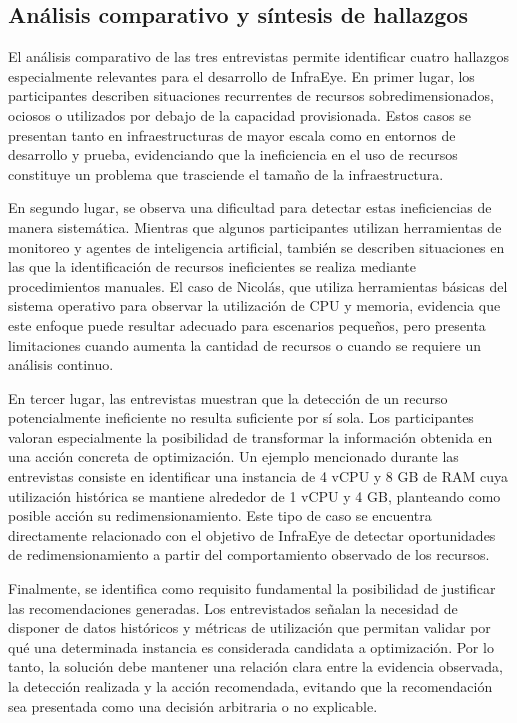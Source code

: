 \subsection{Análisis comparativo y síntesis de hallazgos}

El análisis comparativo de las tres entrevistas permite identificar cuatro hallazgos especialmente relevantes para el desarrollo de InfraEye. En primer lugar, los participantes describen situaciones recurrentes de recursos sobredimensionados, ociosos o utilizados por debajo de la capacidad provisionada. Estos casos se presentan tanto en infraestructuras de mayor escala como en entornos de desarrollo y prueba, evidenciando que la ineficiencia en el uso de recursos constituye un problema que trasciende el tamaño de la infraestructura.

En segundo lugar, se observa una dificultad para detectar estas ineficiencias de manera sistemática. Mientras que algunos participantes utilizan herramientas de monitoreo y agentes de inteligencia artificial, también se describen situaciones en las que la identificación de recursos ineficientes se realiza mediante procedimientos manuales. El caso de Nicolás, que utiliza herramientas básicas del sistema operativo para observar la utilización de CPU y memoria, evidencia que este enfoque puede resultar adecuado para escenarios pequeños, pero presenta limitaciones cuando aumenta la cantidad de recursos o cuando se requiere un análisis continuo.

En tercer lugar, las entrevistas muestran que la detección de un recurso potencialmente ineficiente no resulta suficiente por sí sola. Los participantes valoran especialmente la posibilidad de transformar la información obtenida en una acción concreta de optimización. Un ejemplo mencionado durante las entrevistas consiste en identificar una instancia de 4 vCPU y 8 GB de RAM cuya utilización histórica se mantiene alrededor de 1 vCPU y 4 GB, planteando como posible acción su redimensionamiento. Este tipo de caso se encuentra directamente relacionado con el objetivo de InfraEye de detectar oportunidades de redimensionamiento a partir del comportamiento observado de los recursos.

Finalmente, se identifica como requisito fundamental la posibilidad de justificar las recomendaciones generadas. Los entrevistados señalan la necesidad de disponer de datos históricos y métricas de utilización que permitan validar por qué una determinada instancia es considerada candidata a optimización. Por lo tanto, la solución debe mantener una relación clara entre la evidencia observada, la detección realizada y la acción recomendada, evitando que la recomendación sea presentada como una decisión arbitraria o no explicable.

